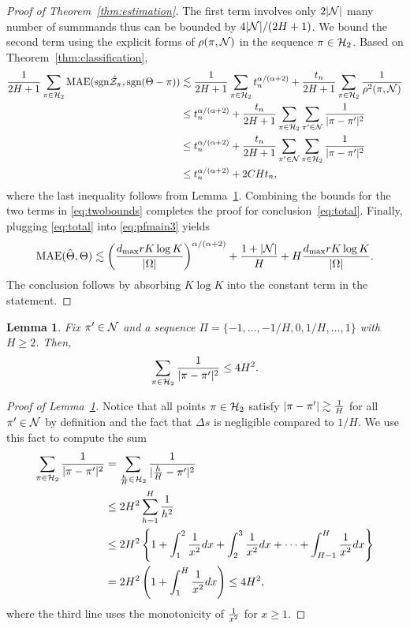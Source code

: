 \documentclass[11pt]{article}
\theoremstyle{plain}
\newtheorem{lem}{Lemma}
\theoremstyle{definition}
\def\sign{\textup{sgn}}
\begin{document}
\begin{proof}[Proof of Theorem~\ref{thm:estimation}]
The first term involves only $2|\mathcal{N}|$ many number of sumnmands thus can be bounded by $4|\mathcal{N}|/(2H+1)$.
 We bound the second term using the explicit forms of $\rho(\pi, \mathcal{N})$ in the sequence $\pi \in\mathcal{H}_2$. Based on Theorem~\ref{thm:classification}, 
\begin{align}
{1\over 2H+1}\sum_{\pi \in \tH_2} \textup{MAE}(\sign \hat \tZ_\pi, \sign (\Theta-\pi)) &\lesssim  {1\over 2H+1}\sum_{\pi\in \tH_2} t_n^{\alpha/(\alpha+2)}+{t_n\over 2H+1}\sum_{\pi \in \tH_2}{1\over \rho^2(\pi, \tN)}\\
&\leq t_n^{\alpha/(\alpha+2)}+{t_n\over 2H+1} \sum_{\pi \in\tH_2} \sum_{\pi' \in \tN}{1\over |\pi-\pi'|^2}\\
&\leq  t_n^{\alpha/(\alpha+2)}+{t_n\over 2H+1} \sum_{\pi'\in \tN} \sum_{\pi \in \tH_2}{1\over |\pi-\pi'|^2}\\
&\leq t_n^{\alpha/(\alpha+2)}+ 2CHt_n,
\end{align}
where the last inequality follows from Lemma~\ref{lem:H}.  Combining the bounds for the two terms in \eqref{eq:twobounds} completes the proof for conclusion~\eqref{eq:total}. Finally, plugging \eqref{eq:total} into \eqref{eq:pfmain3} yields
\begin{align}
\text{MAE}(\hat\Theta,\Theta)\lesssim \left(d_{\max}rK\log K\over |\Omega|\right)^{\alpha/(\alpha+2)}+\frac{1+|\mathcal{N}|}{H}+H{d_{\max}rK\log K\over |\Omega|}.
 \end{align}
The conclusion follows by absorbing $K\log K$ into the constant term in the statement. 
\end{proof}


\begin{lem}\label{lem:H}
Fix $\pi'\in\mathcal{N}$ and a sequence $\Pi=\{-1,\ldots,-1/H,0,1/H,\ldots,1\}$ with $H\geq 2$. Then, 
\[
\sum_{\pi \in \mathcal{H}_2}{1\over 
|\pi-\pi'|^2}\leq 4H^2. 
\]
\end{lem}
\begin{proof}[Proof of Lemma~\ref{lem:H}]
Notice that all points $\pi\in\mathcal{H}_2$ satisfy $|\pi-\pi'|\gtrsim{1\over H}$ for all $\pi'\in\mathcal{N}$ by definition and the fact that $\Delta s$ is negligible compared to $1/H$. We use this fact to compute the sum
\begin{align}
   \sum_{\pi \in \mathcal{H}_2}{1\over |\pi-\pi'|^2}&= \sum_{\frac{h}{H}\in\mathcal{H}_2 } {1\over |\frac{h}{H}-\pi'|^2}\\
   &\leq 2H^2\sum_{h=1}^{H}{1 \over h^2}\\
 &\leq 2H^2\left\{ 1+\int_{1}^2{1\over x^2}dx+ \int_{2}^3{1\over x^2}dx+\cdots + \int_{H-1}^H{1\over x^2}dx\right\}\\
&= 2H^2\left(1+\int^{H}_{1}{1\over x^2}dx\right) \leq 4H^2,
\end{align}
 where the third line uses the monotonicity of ${1\over x^2}$ for $x\geq 1$. 
 \end{proof}
\end{document}
